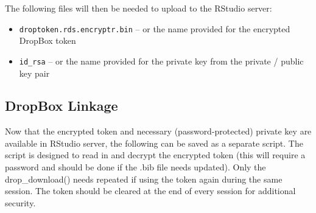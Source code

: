 \documentclass[
]{book}
\providecommand{\tightlist}{%
  \setlength{\itemsep}{0pt}\setlength{\parskip}{0pt}}
\begin{document}
The following files will then be needed to upload to the RStudio server:

\begin{itemize}
\tightlist
\item
  \texttt{droptoken.rds.encryptr.bin} -- or the name provided for the encrypted DropBox token
\item
  \texttt{id\_rsa} -- or the name provided for the private key from the private / public key pair
\end{itemize}

\hypertarget{dropbox-linkage}{%
\subsection{DropBox Linkage}\label{dropbox-linkage}}

Now that the encrypted token and necessary (password-protected) private key are available in RStudio server, the following can be saved as a separate script. The script is designed to read in and decrypt the encrypted token (this will require a password and should be done if the .bib file needs updated). Only the drop\_download() needs repeated if using the token again during the same session. The token should be cleared at the end of every session for additional security.
\end{document}
